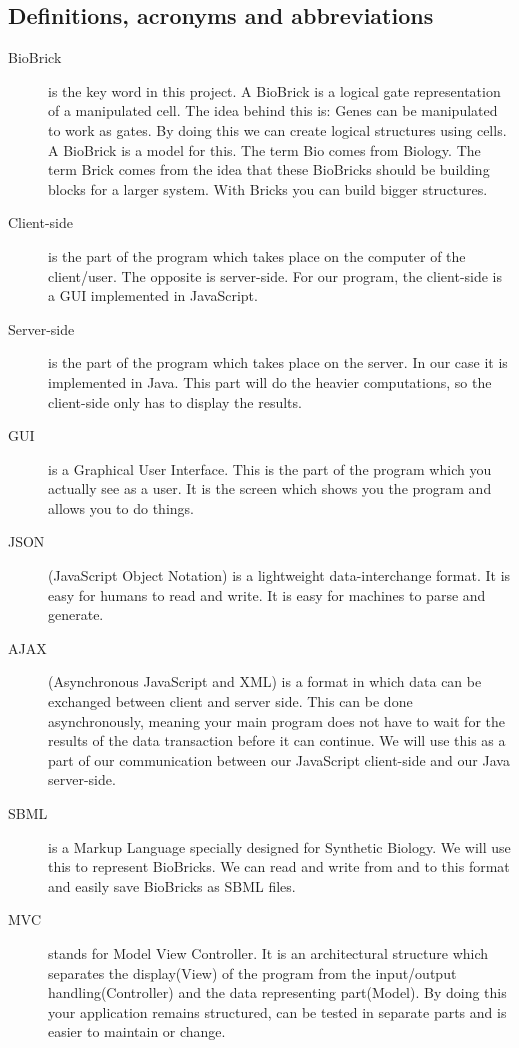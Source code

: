 \documentclass[a4paper]{article}
\begin{document}
\subsection{Definitions, acronyms and abbreviations}
\begin{description}
	\item[BioBrick] is the key word in this project. A BioBrick is a logical gate representation of a manipulated cell. The idea behind this is: Genes can be manipulated to work as gates. By doing this we can create logical structures using cells. A BioBrick is a model for this. The term Bio comes from Biology. The term Brick comes from the idea that these BioBricks should be building blocks for a larger system. With Bricks you can build bigger structures. 
	\item[Client-side] is the part of the program which takes place on the computer of the client/user. The opposite is server-side. For our program, the client-side is a GUI implemented in JavaScript. 
	\item[Server-side] is the part of the program which takes place on the server. In our case it is implemented in Java. This part will do the heavier computations, so the client-side only has to display the results.
	\item[GUI] is a Graphical User Interface. This is the part of the program which you actually see as a user. It is the screen which shows you the program and allows you to do things. 
	\item[JSON] (JavaScript Object Notation) is a lightweight data-interchange format. It is easy for humans to read and write. It is easy for machines to parse and generate.
	\item[AJAX] (Asynchronous JavaScript and XML) is a format in which data can be exchanged between client and server side. This can be done asynchronously, meaning your main program does not have to wait for the results of the data transaction before it can continue. We will use this as a part of our communication between our JavaScript client-side and our Java server-side.
	\item[SBML] is a Markup Language specially designed for Synthetic Biology. We will use this to represent BioBricks. We can read and write from and to this format and easily save BioBricks as SBML files. \\

	\item[MVC] stands for Model View Controller. It is an architectural structure which separates the display(View) of the program from the input/output handling(Controller) and the data representing part(Model). By doing this your application remains structured, can be tested in separate parts and is easier to maintain or change.
\end{description}
\end{document}
